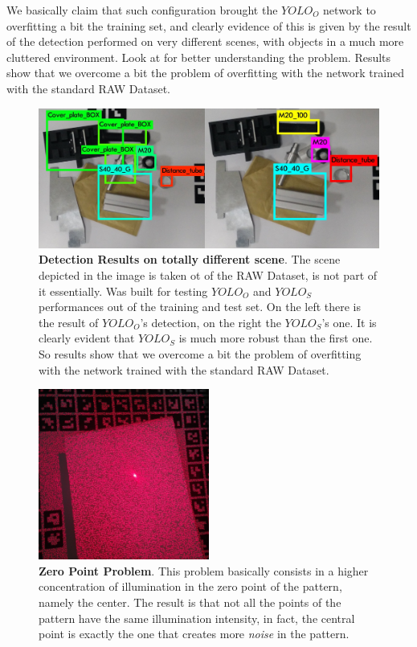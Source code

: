We basically claim that such configuration brought the $YOLO_O$ network to overfitting a bit the training set, and clearly evidence of this is given by the result of the detection performed on very different scenes, with objects in a much more cluttered environment. Look at  for better understanding the problem. Results show that we overcome a bit the problem of overfitting with the network trained with the standard RAW Dataset.

\begin{figure}
    \centering
    \includegraphics[width=\textwidth]{figures/4_experiments/overfitting_problem}
    \caption{\textbf{Detection Results on totally different scene}. The scene depicted in the image is taken ot of the RAW Dataset, is not part of it essentially. Was built for testing $YOLO_O$ and $YOLO_S$ performances out of the training and test set. On the left there is the result of $YOLO_O$'s detection, on the right the $YOLO_S$'s one. It is clearly evident that $YOLO_S$ is much more robust than the first one. So results show that we overcome a bit the problem of overfitting with the network trained with the standard RAW Dataset.}
    \label{fig:overfitting_problem}
\end{figure}

\begin{figure}
    \centering
    \includegraphics[width=0.5\textwidth]{figures/4_experiments/laser_pattern_problem}
    \caption{\textbf{Zero Point Problem}. This problem basically consists in a higher concentration of illumination in the zero point of the pattern, namely the center. The result is that not all the points of the pattern have the same illumination intensity, in fact, the central point is exactly the one that creates more \emph{noise} in the pattern.}
    \label{fig:laser_pattern_problem}
\end{figure}

